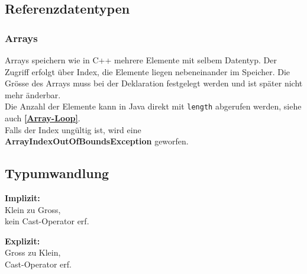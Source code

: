 \subsection{Referenzdatentypen}

\subsubsection{Arrays}
Arrays speichern wie in C++ mehrere Elemente mit selbem Datentyp. Der Zugriff erfolgt über Index, die Elemente liegen nebeneinander im Speicher.
Die Grösse des Arrays muss bei der Deklaration festgelegt werden und ist später nicht mehr änderbar.\\
Die Anzahl der Elemente kann in Java direkt mit \verb|length| abgerufen werden, siehe auch \textbf{\ref{Array-Loop}}.\\
Falls der Index ungültig ist, wird eine\\
\textbf{ArrayIndexOutOfBoundsException} geworfen.

\subsection{Typumwandlung}

\begin{minipage}{0.4\columnwidth}
    \textbf{Implizit:}\\
    Klein zu Gross,\\
    kein Cast-Operator erf.\\
    
\end{minipage}
\begin{minipage}{0.55\columnwidth}
    \textbf{Explizit:}\\
    Gross zu Klein,\\
    Cast-Operator erf.\\
    
\end{minipage}

